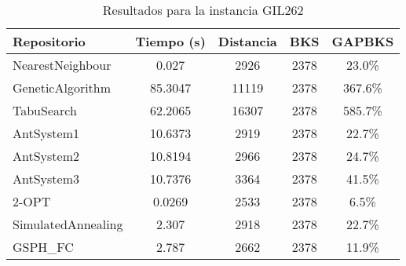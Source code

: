 \begin{table}[H]
\centering
\caption{Resultados para la instancia GIL262}
\begin{tabular}{|l|c|c|c|c|}
\hline
\textbf{Repositorio} & \textbf{Tiempo (s)} & \textbf{Distancia} & \textbf{BKS} & \textbf{GAPBKS} \\ 
\hline
NearestNeighbour & 0.027 & 2926 & 2378 & 23.0\% \\ 
GeneticAlgorithm & 85.3047 & 11119 & 2378 & 367.6\% \\ 
TabuSearch & 62.2065 & 16307 & 2378 & 585.7\% \\ 
AntSystem1 & 10.6373 & 2919 & 2378 & 22.7\% \\ 
AntSystem2 & 10.8194 & 2966 & 2378 & 24.7\% \\ 
AntSystem3 & 10.7376 & 3364 & 2378 & 41.5\% \\ 
2-OPT & 0.0269 & 2533 & 2378 & 6.5\% \\ 
SimulatedAnnealing & 2.307 & 2918 & 2378 & 22.7\% \\ 
GSPH_FC & 2.787 & 2662 & 2378 & 11.9\% \\ 
\hline
\end{tabular}
\end{table}
